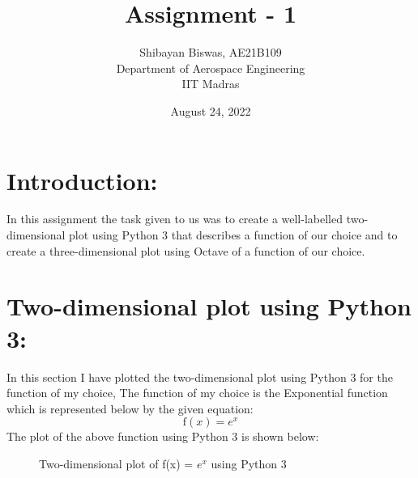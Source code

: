 \documentclass[12pt,a4paper]{article}
\author{Shibayan Biswas, AE21B109\\ Department of Aerospace Engineering\\ IIT Madras}
\title{Assignment - 1}
\date{August 24, 2022}
\begin{document}
\maketitle
\hline
\section{Introduction:}
In this assignment the task given to us was to create a well-labelled two-dimensional plot using Python 3 that describes a function of our choice and to create a three-dimensional plot using Octave of a function of our choice.
\section{Two-dimensional plot using Python 3:}
In this section I have plotted the two-dimensional plot using Python 3 for the function of my choice, The function of my choice is the Exponential function which is represented below by the given equation:
\begin{equation}
    \text{f}(x) = \text{$e^x$}
\end{equation}
The plot of the above function using Python 3 is shown below:
\begin{figure}[!ht]
	\begin{center}
	\end{center}
	\caption{Two-dimensional plot of f(x) = $e^x$ using Python 3}
\end{figure}
\end{document}
